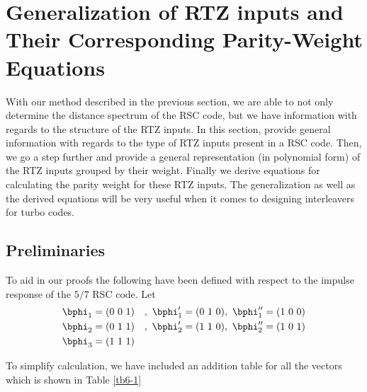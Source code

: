 \section{Generalization of RTZ inputs and Their Corresponding Parity-Weight Equations}
With our method described in the previous section, we are able to not only determine the distance spectrum of the RSC code, but we have information with regards to the structure of the RTZ inputs. In this section, provide general information with regards to the type of RTZ inputs present in a RSC code. Then, we go a step further and provide a general representation (in polynomial form) of the RTZ inputs grouped by their weight. Finally we derive equations for calculating the parity weight for these RTZ inputs. The generalization as well as the derived equations will be very useful when it comes to designing interleavers for turbo codes.

\subsection{Preliminaries}
To aid in our proofs the following have been defined with respect to the impulse response of the $5/7$ RSC code.
Let 
\begin{eqnarray}
&\bphi_1=(0~0~1)&,~\bphi'_1=(0~1~0),~\bphi''_1=(1~0~0)\\
&\bphi_2=(0~1~1)&,~\bphi'_2=(1~1~0),~\bphi''_2=(1~0~1)\\
&\bphi_3=(1~1~1)&
\end{eqnarray}

To simplify calculation, we have included an addition table for all the vectors which is shown in Table \ref{tb6-1}

\begin{table}[h!]
\centering
{}
\caption{Truth Table}
\label{tb6-1}
\end{table}

